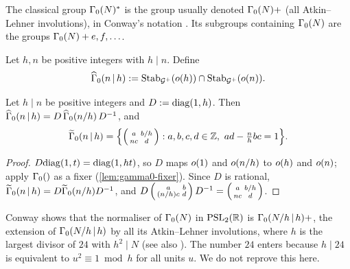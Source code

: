 \begin{remark}
The classical group $\GammaZeroStar{N}$ is the group usually denoted
$\GammaZero{N}+$ (all Atkin--Lehner involutions), in Conway's notation
\cite{Conway1996}. Its subgroups containing $\GammaZero{N}$ are the groups
$\GammaZero{N}+e,f,\ldots$.
\end{remark}

\begin{definition}\label{def:conway-groups}
Let $h, n$ be positive integers with $h \mid n$. Define
\[
  \GammaConway[ad]{n}{h} := \Stab_{\AdelicGroup}(\StdVertex{h}) \cap
  \Stab_{\AdelicGroup}(\StdVertex{n}).
\]
\end{definition}

\begin{lemma}
\label{lem:conway-groups}
Let $h \mid n$ be positive integers and $D := \mathrm{diag}(1,h)$. Then
$\GammaConway[ad]{n}{h} = D\,\GammaZero[ad]{n/h}\,D^{-1}$, and
\[
  \GammaConway[lift]{n}{h} = \Bigl\{\smallMat{a}{b/h}{nc}{d} :
  a,b,c,d \in \ZZ,\ ad - \tfrac{n}{h}bc = 1\Bigr\}.
\]
\end{lemma}

\begin{proof}
$D\mathrm{diag}(1,t) = \mathrm{diag}(1,ht)$, so $D$ maps $o(1)$ and
$o(n/h)$ to $o(h)$ and $o(n)$; apply
$\GammaZero{}$ as a fixer (\cref{lem:gamma0-fixer}). Since $D$ is rational,
$\GammaConway[lift]{n}{h} = D\GammaZero[lift]{n/h}D^{-1}$, and
$D\left(\begin{smallmatrix} a & b \\ (n/h)c & d \end{smallmatrix}\right)D^{-1} = \left(\begin{smallmatrix} a & b/h \\ nc & d \end{smallmatrix}\right)$.
\end{proof}

\begin{remark}\label{rem:conway-normaliser}
Conway \cite{Conway1996} shows that the normaliser of $\GammaZero{N}$ in
$\PSL{2}{\RR}$ is $\GammaConway{N/h}{h}+$, the extension of
$\GammaConway{N/h}{h}$ by all its Atkin--Lehner involutions, where $h$ is
the largest divisor of $24$ with $h^{2} \mid N$ (see also
\cite{AtkinLehner1970}). The number $24$ enters because $h \mid 24$ is
equivalent to $u^{2} \equiv 1 \bmod h$ for all units $u$. We do not reprove
this here.
\end{remark}
